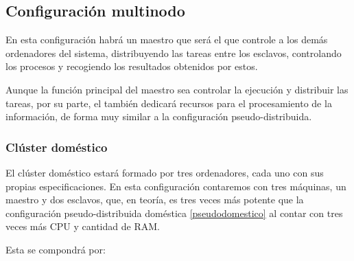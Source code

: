 \subsection{Configuración multinodo}
En esta configuración habrá un maestro que será el que controle a los demás ordenadores del sistema, distribuyendo las tareas entre los esclavos, controlando los procesos y recogiendo los resultados obtenidos por estos. 

Aunque la función principal del maestro sea controlar la ejecución y distribuir las tareas, por su parte, el también dedicará recursos para el procesamiento de la información, de forma muy similar a la configuración pseudo-distribuida.

\subsubsection{Clúster doméstico \label{especifDom}}
El clúster doméstico estará formado por tres ordenadores, cada uno con sus propias especificaciones. En esta configuración contaremos con tres máquinas, un maestro y dos esclavos, que, en teoría, es tres veces más potente que la configuración pseudo-distribuida doméstica \ref{pseudodomestico} al contar con tres veces más \gls{CPU} y cantidad de \gls{RAM}.

Esta se compondrá por:

